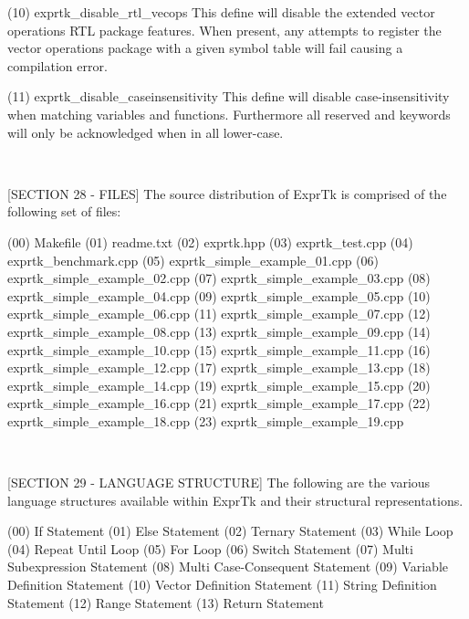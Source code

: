 {(10) exprtk\_disable\_rtl\_vecops
This define will  disable the extended  vector operations RTL  package
features. When present, any attempts to register the vector operations
package with  a given  symbol table  will fail  causing a  compilation
error.

(11) exprtk\_disable\_caseinsensitivity
This define  will disable  case-insensitivity when  matching variables
and  functions. Furthermore  all reserved  and keywords  will only  be
acknowledged when in all lower-case.

~~~~~~~~~~~~~~~~~~~~~~~~~~~~~~~~~~~~~~~~~~~~~~~~~~~~~~~~~~

[SECTION 28 - FILES]
The source distribution of ExprTk is comprised of the following set of
files:

(00) Makefile
(01) readme.txt
(02) exprtk.hpp
(03) exprtk\_test.cpp
(04) exprtk\_benchmark.cpp
(05) exprtk\_simple\_example\_01.cpp
(06) exprtk\_simple\_example\_02.cpp
(07) exprtk\_simple\_example\_03.cpp
(08) exprtk\_simple\_example\_04.cpp
(09) exprtk\_simple\_example\_05.cpp
(10) exprtk\_simple\_example\_06.cpp
(11) exprtk\_simple\_example\_07.cpp
(12) exprtk\_simple\_example\_08.cpp
(13) exprtk\_simple\_example\_09.cpp
(14) exprtk\_simple\_example\_10.cpp
(15) exprtk\_simple\_example\_11.cpp
(16) exprtk\_simple\_example\_12.cpp
(17) exprtk\_simple\_example\_13.cpp
(18) exprtk\_simple\_example\_14.cpp
(19) exprtk\_simple\_example\_15.cpp
(20) exprtk\_simple\_example\_16.cpp
(21) exprtk\_simple\_example\_17.cpp
(22) exprtk\_simple\_example\_18.cpp
(23) exprtk\_simple\_example\_19.cpp

~~~~~~~~~~~~~~~~~~~~~~~~~~~~~~~~~~~~~~~~~~~~~~~~~~~~~~~~~~

[SECTION 29 - LANGUAGE STRUCTURE]
The following  are the  various language  structures available  within
ExprTk and their structural representations.

(00) If Statement
(01) Else Statement
(02) Ternary Statement
(03) While Loop
(04) Repeat Until Loop
(05) For Loop
(06) Switch Statement
(07) Multi Subexpression Statement
(08) Multi Case-Consequent Statement
(09) Variable Definition Statement
(10) Vector Definition Statement
(11) String Definition Statement
(12) Range Statement
(13) Return Statement


}
